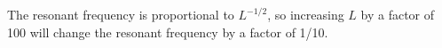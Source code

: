 The resonant frequency is proportional to $L^{-1/2}$, so increasing $L$ by
a factor of 100 will change the resonant frequency by a factor of 1/10.
